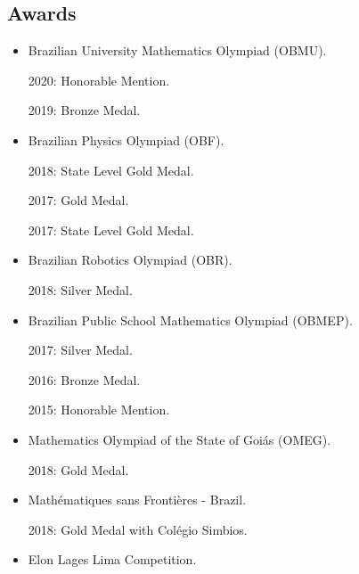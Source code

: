 \documentclass[a4paper]{article}
\begin{document}
\begin{paracol}{2}
\vspace{-1.0em}

\medskip

\section*{\faAward \; Awards}
\scriptsize
\begin{minipage}[t]{0.23\textwidth}
\begin{itemize}
\item Brazilian University Mathematics Olympiad (OBMU).

2020: Honorable Mention.

2019: Bronze Medal.

\item Brazilian Physics Olympiad (OBF).

2018: State Level Gold Medal.

2017: Gold Medal.

2017: State Level Gold Medal.

\item Brazilian Robotics Olympiad (OBR).

2018: Silver Medal.

\end{itemize}
\end{minipage}
\begin{minipage}[t]{0.23\textwidth}
\begin{itemize}
\item Brazilian Public School \newline Mathematics Olympiad (OBMEP).

2017: Silver Medal.

2016: Bronze Medal.

2015: Honorable Mention.

\item Mathematics Olympiad of the State of Goiás (OMEG).

2018: Gold Medal.

\item Mathématiques sans Frontières - Brazil.

2018: Gold Medal with Colégio Simbios.

\end{itemize}
\end{minipage}
\begin{minipage}[t]{0.23\textwidth}
\begin{itemize}
\item Elon Lages Lima Competition.


\end{itemize}
\end{minipage}
\end{paracol}
\end{document}
